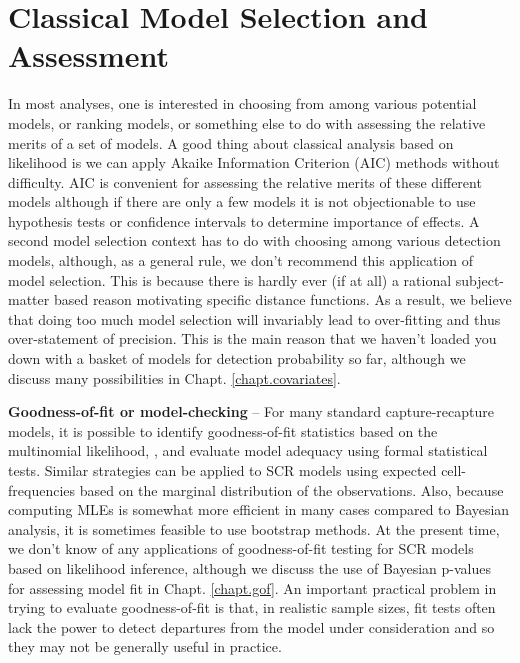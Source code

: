 \section{Classical Model Selection and Assessment}

In most analyses, one is interested in choosing from among various
potential models, or ranking models, or something else to do with
assessing the relative merits of a set of models. A good thing about
classical analysis based on likelihood is we can apply Akaike
Information Criterion (AIC) methods
\citep{burnham_anderson:2002} without difficulty. 
AIC is convenient for assessing the relative
merits of these different models although if there are only a few
models it is not objectionable to use hypothesis tests or confidence
intervals to determine importance of effects. 
A second model
selection context has to do with choosing among various detection
models, although, as a general rule, we don't recommend this
application of model selection.  This is because there is hardly ever
(if at all) a rational subject-matter based reason motivating specific
distance functions. As a result, we believe that doing too much model
selection will invariably lead to over-fitting and thus over-statement
of precision. This is the main reason that we haven't loaded you down
with a basket of models for detection probability so far, although we
discuss many possibilities in Chapt. \ref{chapt.covariates}.


{\bf Goodness-of-fit or model-checking} -- For many standard capture-recapture models,
it is possible to identify goodness-of-fit statistics 
based on the
multinomial likelihood,
\citep[][Chapt. 5]{cooch_white:2006},
 and evaluate model adequacy using formal
statistical tests. Similar strategies can be applied to SCR models
using expected cell-frequencies based on the marginal distribution of
the observations. Also, because computing MLEs is somewhat more
efficient in many cases compared to Bayesian analysis, it is 
sometimes feasible to use bootstrap methods. At the present time,
we don't know of any applications of goodness-of-fit testing for SCR
models based on likelihood inference, although we discuss the use of
Bayesian p-values for assessing model fit in Chapt. \ref{chapt.gof}. An
important practical problem in trying to evaluate  goodness-of-fit is
that, in realistic sample sizes, fit tests often lack the power to
detect departures from the model under consideration and so they may
not be generally useful in practice. 


